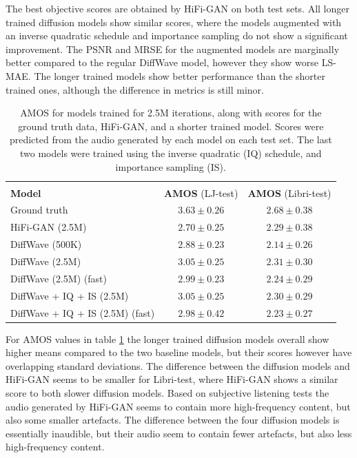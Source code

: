 \documentclass{report}
\begin{document}
The best objective scores are obtained by HiFi-GAN on both test sets. All longer trained diffusion models show similar scores, where the models augmented with an inverse quadratic schedule and importance sampling do not show a significant improvement. The PSNR and MRSE for the augmented models are marginally better compared to the regular DiffWave model, however they show worse LS-MAE. The longer trained models show better performance than the shorter trained ones, although the difference in metrics is still minor.

\begin{table}[H]
\centering
\def\arraystretch{1.3}
\begin{tabular}{l c c}
 \hline\hline
 \vspace{-0.5cm} \\
 \textbf{Model} & \textbf{AMOS} (LJ-test) & \textbf{AMOS} (Libri-test) \\ [0.5ex]
 \hline
 Ground truth & $3.63 \pm 0.26$ & $ 2.68 \pm 0.38$ \\
 \hline
 HiFi-GAN (2.5M) & $2.70 \pm 0.25$ & $ 2.29 \pm 0.38 $ \\
 \hline
 DiffWave (500K) & $2.88 \pm 0.23$ & $2.14 \pm 0.26$ \\
 \hline
 \hline
 DiffWave (2.5M) & $3.05 \pm 0.25$ & $2.31 \pm 0.30$ \\
 \hline
 DiffWave (2.5M) (fast) & $2.99 \pm 0.23$ & $2.24 \pm 0.29$ \\
 \hline
 DiffWave + IQ + IS (2.5M) & $3.05 \pm 0.25 $ & $2.30 \pm 0.29 $ \\
 \hline
 DiffWave + IQ + IS (2.5M) (fast) & $2.98 \pm 0.42$ & $2.23 \pm 0.27$ \\
 \hline\hline
\end{tabular}
\caption{\onehalfspacing AMOS for models trained for 2.5M iterations, along with scores for the ground truth data, HiFi-GAN, and a shorter trained model. Scores were predicted from the audio generated by each model on each test set. The last two models were trained using the inverse quadratic (IQ) schedule, and importance sampling (IS).}
\label{table:bigamos}
\end{table}

For AMOS values in table \ref{table:bigamos} the longer trained diffusion models overall show higher means compared to the two baseline models, but their scores however have overlapping standard deviations. The difference between the diffusion models and HiFi-GAN seems to be smaller for Libri-test, where HiFi-GAN shows a similar score to both slower diffusion models. Based on subjective listening tests the audio generated by HiFi-GAN seems to contain more high-frequency content, but also some smaller artefacts. The difference between the four diffusion models is essentially inaudible, but their audio seem to contain fewer artefacts, but also less high-frequency content.
\end{document}
